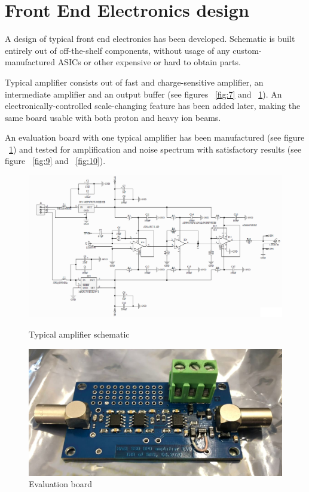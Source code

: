 \documentclass[a4paper]{jpconf}
\begin{document}
\section{Front End Electronics design}
A design of typical front end electronics has been developed. Schematic is built entirely out of off-the-shelf components, without usage of any custom-manufactured ASICs or other expensive or hard to obtain parts.

Typical amplifier consists out of fast and charge-sensitive amplifier, an intermediate amplifier and an output buffer (see figures ~\ref{fig:7} and ~\ref{fig:8}). An electronically-controlled scale-changing feature has been added later, making the same board usable with both proton and heavy ion beams.

An evaluation board with one typical amplifier has been manufactured (see figure ~\ref{fig:8}) and tested for amplification and noise spectrum with satisfactory results (see figure ~\ref{fig:9} and ~\ref{fig:10}).

\begin{figure}[htbp]
	\begin{minipage}{18pc}
		\includegraphics[width=\textwidth]{schematic.png}
		\caption{\label{fig:7} Typical amplifier schematic}
	\end{minipage}\hspace{2pc}
	\begin{minipage}{18pc}
		\includegraphics[width=\textwidth]{amp_photo.png}
		\caption{\label{fig:8} Evaluation board}
	\end{minipage} 
\end{figure}
\end{document}

